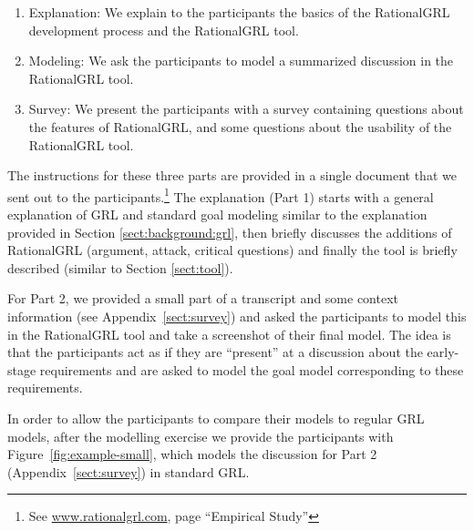 \begin{enumerate}
\item Explanation: We explain to the participants the basics of the RationalGRL development process and the RationalGRL tool.
\item Modeling: We ask the participants to model a summarized discussion in the RationalGRL tool.
\item Survey: We present the participants with a survey containing questions about the features of RationalGRL, and some questions about the usability of the RationalGRL tool.
\end{enumerate}

The instructions for these three parts are provided in a single document that we sent out to the participants.\footnote{See \url{www.rationalgrl.com}, page ``Empirical Study''} The explanation (Part 1) starts with a general explanation of GRL and standard goal modeling similar to the explanation provided in Section \ref{sect:background:grl}, then briefly discusses the additions of RationalGRL (argument, attack, critical questions) and finally the tool is briefly described (similar to Section \ref{sect:tool}). 

For Part 2, we provided a small part of a transcript and some context information (see Appendix~\ref{sect:survey}) and asked the participants to model this in the RationalGRL tool and take a screenshot of their final model. The idea is that the participants act as if they are ``present'' at a discussion about the early-stage requirements and are asked to model the goal model corresponding to these requirements. 

In order to allow the participants to compare their models to regular GRL models, after the modelling exercise we provide the participants with Figure~\ref{fig:example-small}, which models the discussion for Part 2 (Appendix~\ref{sect:survey}) in standard GRL.

